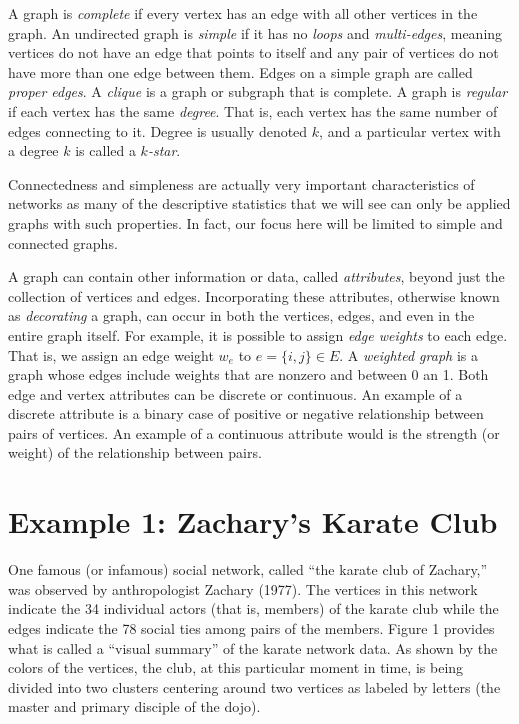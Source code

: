 \documentclass[12pt,twoside]{amherstthesis}
\begin{document}
  A graph is \emph{complete} if every vertex has an edge with all other
  vertices in the graph. An undirected graph is \emph{simple} if it has no
  \emph{loops} and \emph{multi-edges}, meaning vertices do not have an
  edge that points to itself and any pair of vertices do not have more
  than one edge between them. Edges on a simple graph are called
  \emph{proper edges}. A \emph{clique} is a graph or subgraph that is
  complete. A graph is \emph{regular} if each vertex has the same
  \emph{degree}. That is, each vertex has the same number of edges
  connecting to it. Degree is usually denoted \(k\), and a particular
  vertex with a degree \(k\) is called a \emph{\(k\)-star}.
  
  Connectedness and simpleness are actually very important characteristics
  of networks as many of the descriptive statistics that we will see can
  only be applied graphs with such properties. In fact, our focus here
  will be limited to simple and connected graphs.
  
  A graph can contain other information or data, called \emph{attributes},
  beyond just the collection of vertices and edges. Incorporating these
  attributes, otherwise known as \emph{decorating} a graph, can occur in
  both the vertices, edges, and even in the entire graph itself. For
  example, it is possible to assign \emph{edge weights} to each edge. That
  is, we assign an edge weight \(w_e\) to \(e = \{i, j\} \in E\). A
  \emph{weighted graph} is a graph whose edges include weights that are
  nonzero and between 0 an 1. Both edge and vertex attributes can be
  discrete or continuous. An example of a discrete attribute is a binary
  case of positive or negative relationship between pairs of vertices. An
  example of a continuous attribute would is the strength (or weight) of
  the relationship between pairs.
  
  \section{Example 1: Zachary's Karate
  Club}\label{example-1-zacharys-karate-club}
  
  One famous (or infamous) social network, called ``the karate club of
  Zachary,'' was observed by anthropologist Zachary (1977). The vertices
  in this network indicate the 34 individual actors (that is, members) of
  the karate club while the edges indicate the 78 social ties among pairs
  of the members. Figure 1 provides what is called a ``visual summary'' of
  the karate network data. As shown by the colors of the vertices, the
  club, at this particular moment in time, is being divided into two
  clusters centering around two vertices as labeled by letters (the master
  and primary disciple of the dojo).
  
\end{document}

